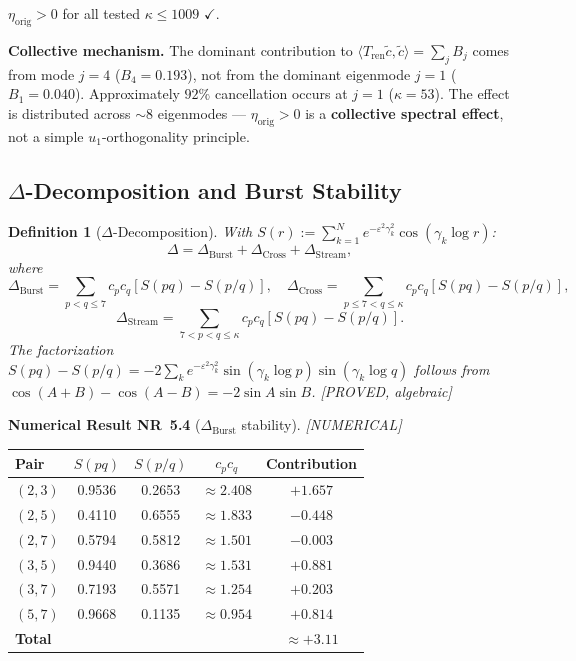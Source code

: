 \documentclass[11pt]{article}
\newtheorem{definition}[theorem]{Definition}
\newcommand{\etaorig}{\eta_{\mathrm{orig}}}
\newcommand{\Tren}{T_{\mathrm{ren}}}
\newcommand{\Dburstvar}{\Delta_{\mathrm{Burst}}}
\newcommand{\Dcross}{\Delta_{\mathrm{Cross}}}
\newcommand{\Dstream}{\Delta_{\mathrm{Stream}}}
\begin{document}
$\etaorig > 0$ for all tested $\kappa\leq 1009$ $\checkmark$.

\textbf{Collective mechanism.}
The dominant contribution to $\langle\Tren\tilde{c},\tilde{c}\rangle
= \sum_j B_j$ comes from mode $j=4$ ($B_4=0.193$),
not from the dominant eigenmode $j=1$ ($B_1=0.040$).
Approximately $92\%$ cancellation occurs at $j=1$ ($\kappa=53$).
The effect is distributed across $\sim 8$ eigenmodes ---
$\etaorig > 0$ is a \textbf{collective spectral effect}, not a simple
$u_1$-orthogonality principle.

\subsection{$\Delta$-Decomposition and Burst Stability}

\begin{definition}[$\Delta$-Decomposition]
With $S(r) := \sum_{k=1}^N e^{-\varepsilon^2\gamma_k^2}\cos(\gamma_k\log r)$:
\[
\Delta = \Dburstvar + \Dcross + \Dstream,
\]
where
\[
\Dburstvar = \sum_{p < q\leq 7}c_p c_q[S(pq)-S(p/q)],
\quad
\Dcross = \sum_{p\leq 7 < q\leq\kappa}c_p c_q[S(pq)-S(p/q)],
\]
\[
\Dstream = \sum_{7 < p < q\leq\kappa}c_p c_q[S(pq)-S(p/q)].
\]
The factorization
$S(pq)-S(p/q) = -2\sum_k e^{-\varepsilon^2\gamma_k^2}
\sin(\gamma_k\log p)\sin(\gamma_k\log q)$
follows from $\cos(A+B)-\cos(A-B) = -2\sin A\sin B$. [PROVED, algebraic]
\end{definition}

\textbf{Numerical Result NR~5.4} ($\Dburstvar$ stability).
\emph{[NUMERICAL]}

\begin{center}
\begin{tabular}{lcccc}
\toprule
Pair & $S(pq)$ & $S(p/q)$ & $c_p c_q$ & Contribution \\
\midrule
$(2,3)$ & 0.9536 & 0.2653 & $\approx 2.408$ & $+1.657$ \\
$(2,5)$ & 0.4110 & 0.6555 & $\approx 1.833$ & $-0.448$ \\
$(2,7)$ & 0.5794 & 0.5812 & $\approx 1.501$ & $-0.003$ \\
$(3,5)$ & 0.9440 & 0.3686 & $\approx 1.531$ & $+0.881$ \\
$(3,7)$ & 0.7193 & 0.5571 & $\approx 1.254$ & $+0.203$ \\
$(5,7)$ & 0.9668 & 0.1135 & $\approx 0.954$ & $+0.814$ \\
\midrule
\textbf{Total} & & & & $\mathbf{\approx +3.11}$ \\
\bottomrule
\end{tabular}
\end{center}
\end{document}
